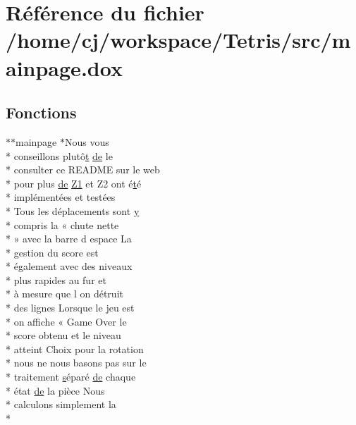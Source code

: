 \hypertarget{mainpage_8dox}{\section{Référence du fichier /home/cj/workspace/\-Tetris/src/mainpage.dox}
\label{mainpage_8dox}
}
\subsection*{Fonctions}
\begin{DoxyCompactItemize}
\item 
$\ast$$\ast$mainpage $\ast$Nous vous \\*
conseillons plutô\hyperlink{gl_8h_a00140d6f5c548b26daf170bf16e86a6d}{t} \hyperlink{mainpage_8dox_ab37fa35e77d95c6d0d0ab620c97c3db8}{de} le \\*
consulter ce R\-E\-A\-D\-M\-E sur le web \\*
pour plus \hyperlink{mainpage_8dox_ab37fa35e77d95c6d0d0ab620c97c3db8}{de} \hyperlink{mainpage_8dox_ac1b4262bdb6c0693bc375775d6cfa421}{Z1} et Z2 ont é\hyperlink{gl_8h_a00140d6f5c548b26daf170bf16e86a6d}{t}é \\*
implémentées et testées \\*
Tous les déplacements sont \hyperlink{gl_8h_a74d80fd479c0f6d0153c709949a089ef}{y} \\*
compris la « chute nette \\*
» avec la barre d espace La \\*
gestion du score est \\*
également avec des niveaux \\*
plus rapides au fur et \\*
à mesure que l on détruit \\*
des lignes Lorsque le jeu est \\*
on affiche « Game Over le \\*
score obtenu et le niveau \\*
atteint Choix pour la rotation \\*
nous ne nous basons pas sur le \\*
traitement \hyperlink{gl_8h_ad585a1393cfa368fa9dc3d8ebff640d5}{s}éparé \hyperlink{mainpage_8dox_ab37fa35e77d95c6d0d0ab620c97c3db8}{de} chaque \\*
état \hyperlink{mainpage_8dox_ab37fa35e77d95c6d0d0ab620c97c3db8}{de} la pièce Nous \\*
calculons simplement la \\*
$$
\end{DoxyCompactItemize}
